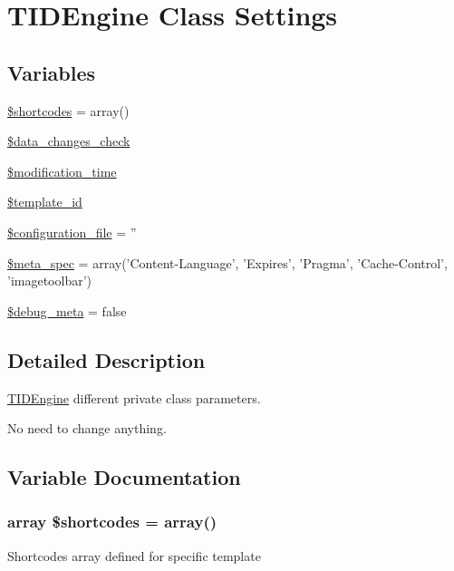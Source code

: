 \hypertarget{group__priv__settings}{
\section{TIDEngine Class Settings}
\label{group__priv__settings}
}
\subsection*{Variables}
\begin{DoxyCompactItemize}
\item 
\hyperlink{group__priv__settings_gaac9c786f32cb63904e4579cc2bded602}{\$shortcodes} = array()
\item 
\hyperlink{group__priv__settings_gade4bdb833871c0c762dd08d7ae627218}{\$data\_\-changes\_\-check}
\item 
\hyperlink{group__priv__settings_ga1c507c75ecec577b312bb845ff0e5cc2}{\$modification\_\-time}
\item 
\hyperlink{group__priv__settings_ga88d4a982e092d52e64e05ee2b28f418f}{\$template\_\-id}
\item 
\hyperlink{group__priv__settings_ga25b8691d25affc422f8de6218c2adc44}{\$configuration\_\-file} = ''
\item 
\hyperlink{group__priv__settings_ga9296b8da0b01b82041584bbf469081ce}{\$meta\_\-spec} = array('Content-\/Language', 'Expires', 'Pragma', 'Cache-\/Control', 'imagetoolbar')
\item 
\hyperlink{group__priv__settings_ga25d50f7db79ecf7fc2a94c16eacfac6b}{\$debug\_\-meta} = false
\end{DoxyCompactItemize}


\subsection{Detailed Description}
\hyperlink{class_t_i_d_engine}{TIDEngine} different private class parameters.

No need to change anything. 

\subsection{Variable Documentation}
\hypertarget{group__priv__settings_gaac9c786f32cb63904e4579cc2bded602}{
\subsubsection[{\$shortcodes}]{\setlength{\rightskip}{0pt plus 5cm}array \$shortcodes = array()}}
\label{group__priv__settings_gaac9c786f32cb63904e4579cc2bded602}
Shortcodes array defined for specific template 

